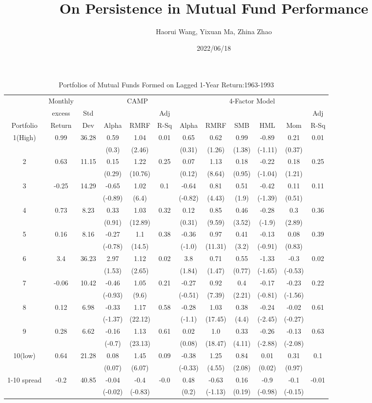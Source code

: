 \documentclass[a4paper]{article}
\title{On Persistence in Mutual Fund Performance}
\author{Haorui Wang, Yixuan Ma, Zhina Zhao}
\date{2022/06/18}
\begin{document}
\maketitle
\begin{table}[h!]
\centering
\begin{tabular}{c cc ccc cccccc} 
\toprule[1.5pt]
  &  Monthly &  & \multicolumn{3}{c}{CAMP} &  \multicolumn{6}{c}{4-Factor Model}\\
  & excess& Std &   &  & Adj &   &  &  &  &  & Adj\\
 Portfolio & Return & Dev & Alpha  & RMRF & R-Sq &  Alpha  & RMRF & SMB & HML & Mom &  R-Sq\\

\toprule[1.5pt]
1(High)&0.99&36.28&0.59&1.04&0.01&0.65&0.62&0.99&-0.89&0.21&0.01\\
&&&(0.3)&(2.46)&&(0.31)&(1.26)&(1.38)&(-1.11)&(0.37)&\\
2&0.63&11.15&0.15&1.22&0.25&0.07&1.13&0.18&-0.22&0.18&0.25\\
&&&(0.29)&(10.76)&&(0.12)&(8.64)&(0.95)&(-1.04)&(1.21)&\\
3&-0.25&14.29&-0.65&1.02&0.1&-0.64&0.81&0.51&-0.42&0.11&0.11\\
&&&(-0.89)&(6.4)&&(-0.82)&(4.43)&(1.9)&(-1.39)&(0.51)&\\
4&0.73&8.23&0.33&1.03&0.32&0.12&0.85&0.46&-0.28&0.3&0.36\\
&&&(0.91)&(12.89)&&(0.31)&(9.59)&(3.52)&(-1.9)&(2.89)&\\
5&0.16&8.16&-0.27&1.1&0.38&-0.36&0.97&0.41&-0.13&0.08&0.39\\
&&&(-0.78)&(14.5)&&(-1.0)&(11.31)&(3.2)&(-0.91)&(0.83)&\\
6&3.4&36.23&2.97&1.12&0.02&3.8&0.71&0.55&-1.33&-0.3&0.02\\
&&&(1.53)&(2.65)&&(1.84)&(1.47)&(0.77)&(-1.65)&(-0.53)&\\
7&-0.06&10.42&-0.46&1.05&0.21&-0.27&0.92&0.4&-0.17&-0.23&0.22\\
&&&(-0.93)&(9.6)&&(-0.51)&(7.39)&(2.21)&(-0.81)&(-1.56)&\\
8&0.12&6.98&-0.33&1.17&0.58&-0.28&1.03&0.38&-0.24&-0.02&0.61\\
&&&(-1.37)&(22.12)&&(-1.1)&(17.45)&(4.4)&(-2.45)&(-0.27)&\\
9&0.28&6.62&-0.16&1.13&0.61&0.02&1.0&0.33&-0.26&-0.13&0.63\\
&&&(-0.7)&(23.13)&&(0.08)&(18.47)&(4.11)&(-2.88)&(-2.08)&\\
10(low)&0.64&21.28&0.08&1.45&0.09&-0.38&1.25&0.84&0.01&0.31&0.1\\
&&&(0.07)&(6.07)&&(-0.33)&(4.55)&(2.08)&(0.02)&(0.97)&\\
1-10 spread&-0.2&40.85&-0.04&-0.4&-0.0&0.48&-0.63&0.16&-0.9&-0.1&-0.01\\
&&&(-0.02)&(-0.83)&&(0.2)&(-1.13)&(0.19)&(-0.98)&(-0.15)&\\

\toprule[1.5pt]
\end{tabular}
\caption{Portfolios of Mutual Funds Formed on Lagged 1-Year Return:1963-1993}
\label{table:1}
\end{table}
     
\end{document}
